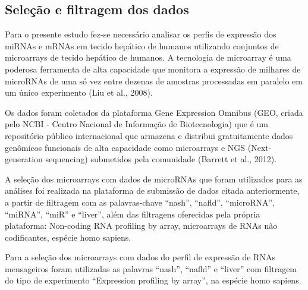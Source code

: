 \documentclass[12pt, a4paper]{article}
\begin{document}
    \subsection{Seleção e filtragem dos dados}
    \par Para o presente estudo fez-se necessário analisar os perfis de expressão dos miRNAs e mRNAs em tecido hepático de humanos utilizando conjuntos de microarrays de tecido hepático de humanos. A tecnologia de microarray é uma poderosa ferramenta de alta capacidade que monitora a expressão de milhares de microRNAs de uma só vez entre dezenas de amostras processadas em paralelo em um único experimento (Liu et al., 2008).
    \par Os dados foram coletados da plataforma Gene Expression Omnibus (GEO, criada pelo NCBI - Centro Nacional de Informação de Biotecnologia) que é um repositório público internacional que armazena e distribui gratuitamente dados genômicos funcionais de alta capacidade como microarrays e NGS (Next-generation sequencing) submetidos pela comunidade (Barrett et al., 2012).
    \par A seleção dos microarrays com dados de microRNAs que foram utilizados para as análises foi realizada na plataforma de submissão de dados citada anteriormente, a partir de filtragem com as palavras-chave “nash”, “nafld”, “microRNA”, “miRNA”, “miR” e “liver”, além das filtragens oferecidas pela própria plataforma: Non-coding RNA profiling by array, microarrays de RNAs não codificantes, espécie homo sapiens.
    \par Para a seleção dos microarrays com dados do perfil de expressão de RNAs mensageiros foram utilizadas as palavras “nash”, “nafld” e “liver” com filtragem do tipo de experimento “Expression profiling by array”, na espécie homo sapiens.
\end{document}
